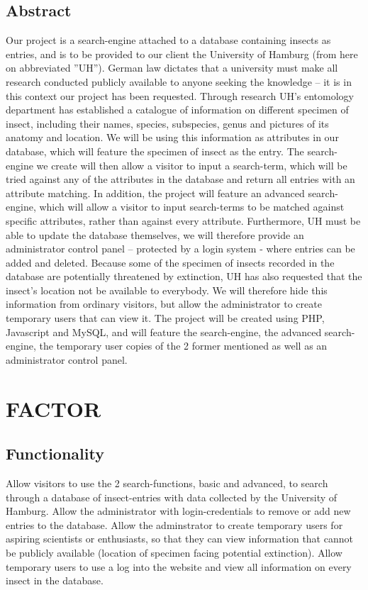 \documentclass[12pt,a4paper]{article}
\begin{document}
\subsection{Abstract}
Our project is a search-engine attached to a database containing insects as entries, and is to be provided to our client the University of Hamburg (from here on abbreviated ”UH”).
German law dictates that a university must make all research conducted publicly available to anyone seeking the knowledge – it is in this context our project has been requested.
Through research UH's entomology department has established a catalogue of information on different specimen of insect, including their names, species, subspecies, genus and pictures of its anatomy and location.
We will be using this information as attributes in our database, which will feature the specimen of insect as the entry.
The search-engine we create will then allow a visitor to input a search-term, which will be tried against any of the attributes in the database and return all entries with an attribute matching.
In addition, the project will feature an advanced search-engine, which will allow a visitor to input search-terms to be matched against specific attributes, rather than against every attribute.
Furthermore, UH must be able to update the database themselves, we will therefore provide an administrator control panel – protected by a login system - where entries can be added and deleted.
Because some of the specimen of insects recorded in the database are potentially threatened by extinction, UH has also requested that the insect's location not be available to everybody.
We will therefore hide this information from ordinary visitors, but allow the administrator to create temporary users that can view it.
The project will be created using PHP, Javascript and MySQL, and will feature the search-engine, the advanced search-engine, the temporary user copies of the 2 former mentioned as well as an administrator control panel.
\newpage

\section{FACTOR}
\subsection{Functionality}
Allow visitors to use the 2 search-functions, basic and advanced, to search through a database
of insect-entries with data collected by the University of Hamburg. 
Allow the administrator with login-credentials to remove or add new entries to the database.
Allow the adminstrator to create temporary users for aspiring scientists or enthusiasts, so that they can view information that cannot be publicly available (location of specimen facing potential extinction).
Allow temporary users to use a log into the website and view all information on every insect in the database. 
\end{document}
